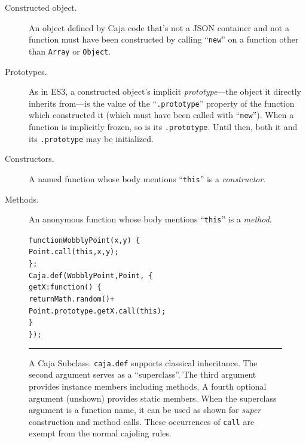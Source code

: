 \documentclass[letterpaper,twocolumn,10pt]{article}
\newcommand{\code}[1]{{\tt {#1}}}              %
\begin{document}
\begin{description}

  \item[Constructed object.] An object defined by Caja code that's not a JSON 
  container and not a function must have been constructed by calling 
  ``\code{new}'' on a function other than \code{Array} or \code{Object}.

  \item[Prototypes.] As in ES3, a constructed object's implicit 
  \emph{prototype}---the object it directly inherits from---is the value of 
  the ``\code{.prototype}'' property of the function which constructed it 
  (which must have been called with ``\code{new}''). When a function is 
  implicitly frozen, so is its \code{.prototype}. Until then, both it and its 
  \code{.prototype} may be initialized. 

  \item[Constructors.] A named function whose body mentions ``\code{this}'' 
  is a \emph{constructor}. 
    
  \item[Methods.] An anonymous function whose body mentions ``\code{this}'' 
  is a \emph{method}. 
  
\end{description}


\begin{figure}[t!]
\begin{alltt}
function WobblyPoint(x, y)\ \{
  Point.call(this, x, y);
\};
Caja.def(WobblyPoint, Point,\ \{
  getX: function()\ \{ 
    return Math.random() +
      Point.prototype.getX.call(this); 
  \}
\});
\end{alltt}

\caption[A Caja Subclass.]{A Caja Subclass. \code{caja.def} supports 
classical inheritance. The second argument serves as a ``superclass''. The 
third argument provides instance members including methods. A fourth optional 
argument (unshown) provides static members. When the superclass argument is a 
function name, it can be used as shown for \emph{super} construction and 
method calls. These occurrences of \code{call} are exempt from the normal 
cajoling rules. \\ } \hrule
\label{fig:caja-subclass}
\end{figure}
\end{document}
